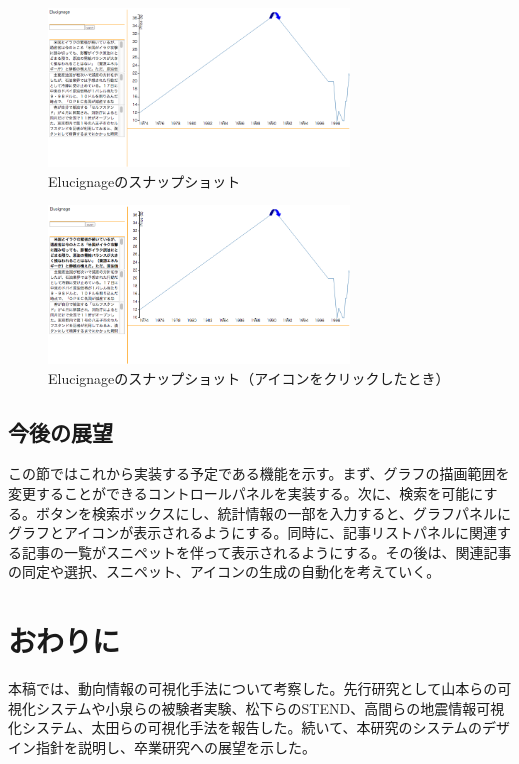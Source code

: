 \documentclass{matsushita-zemi}
\begin{document}
\begin{figure}[tb]
  \begin{center}
   \includegraphics[width=8cm,bb=0 0 852 448]{Elucignageprototype.png}
  \end{center}
 \caption{Elucignageのスナップショット}
 \label{Elucignage}
\end{figure}
\begin{figure}[tb]
  \begin{center}
   \includegraphics[width=8cm,bb=0 0 853 448]{Elucignage_click.png}
  \end{center}
 \caption{Elucignageのスナップショット（アイコンをクリックしたとき）}
 \label{Elucignage_click}
\end{figure}

\subsection{今後の展望}
この節ではこれから実装する予定である機能を示す。まず、グラフの描画範囲を変更することができるコントロールパネルを実装する。次に、検索を可能にする。ボタンを検索ボックスにし、統計情報の一部を入力すると、グラフパネルにグラフとアイコンが表示されるようにする。同時に、記事リストパネルに関連する記事の一覧がスニペットを伴って表示されるようにする。その後は、関連記事の同定や選択、スニペット、アイコンの生成の自動化を考えていく。


\section{おわりに}
本稿では、動向情報の可視化手法について考察した。先行研究として山本らの可視化システムや小泉らの被験者実験、松下らのSTEND、高間らの地震情報可視化システム、太田らの可視化手法を報告した。続いて、本研究のシステムのデザイン指針を説明し、卒業研究への展望を示した。



\end{document}
